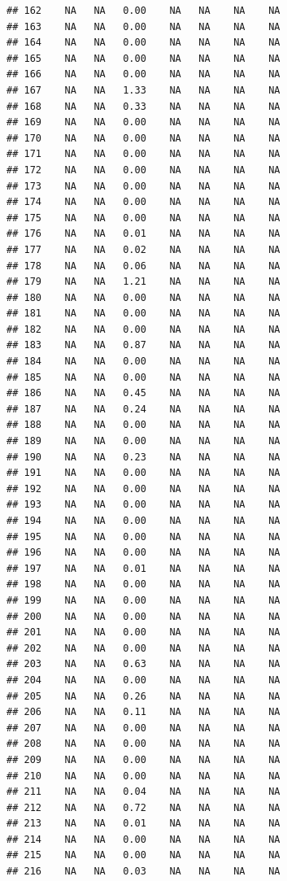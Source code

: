 \documentclass{article}\usepackage{graphicx, color}
\makeatletter
\newenvironment{kframe}{%
 \def\at@end@of@kframe{}%
 \ifinner\ifhmode%
  \def\at@end@of@kframe{\end{minipage}}%
  \begin{minipage}{\columnwidth}%
 \fi\fi%
 \def\FrameCommand##1{\hskip\@totalleftmargin \hskip-\fboxsep
 \colorbox{shadecolor}{##1}\hskip-\fboxsep
     \hskip-\linewidth \hskip-\@totalleftmargin \hskip\columnwidth}%
 \MakeFramed {\advance\hsize-\width
   \@totalleftmargin\z@ \linewidth\hsize
   \@setminipage}}%
 {\par\unskip\endMakeFramed%
 \at@end@of@kframe}
\newenvironment{knitrout}{}{} %
\makeatother
\begin{document}
\begin{knitrout}
\begin{kframe}
\begin{verbatim}
## 162    NA   NA   0.00    NA   NA    NA    NA
## 163    NA   NA   0.00    NA   NA    NA    NA
## 164    NA   NA   0.00    NA   NA    NA    NA
## 165    NA   NA   0.00    NA   NA    NA    NA
## 166    NA   NA   0.00    NA   NA    NA    NA
## 167    NA   NA   1.33    NA   NA    NA    NA
## 168    NA   NA   0.33    NA   NA    NA    NA
## 169    NA   NA   0.00    NA   NA    NA    NA
## 170    NA   NA   0.00    NA   NA    NA    NA
## 171    NA   NA   0.00    NA   NA    NA    NA
## 172    NA   NA   0.00    NA   NA    NA    NA
## 173    NA   NA   0.00    NA   NA    NA    NA
## 174    NA   NA   0.00    NA   NA    NA    NA
## 175    NA   NA   0.00    NA   NA    NA    NA
## 176    NA   NA   0.01    NA   NA    NA    NA
## 177    NA   NA   0.02    NA   NA    NA    NA
## 178    NA   NA   0.06    NA   NA    NA    NA
## 179    NA   NA   1.21    NA   NA    NA    NA
## 180    NA   NA   0.00    NA   NA    NA    NA
## 181    NA   NA   0.00    NA   NA    NA    NA
## 182    NA   NA   0.00    NA   NA    NA    NA
## 183    NA   NA   0.87    NA   NA    NA    NA
## 184    NA   NA   0.00    NA   NA    NA    NA
## 185    NA   NA   0.00    NA   NA    NA    NA
## 186    NA   NA   0.45    NA   NA    NA    NA
## 187    NA   NA   0.24    NA   NA    NA    NA
## 188    NA   NA   0.00    NA   NA    NA    NA
## 189    NA   NA   0.00    NA   NA    NA    NA
## 190    NA   NA   0.23    NA   NA    NA    NA
## 191    NA   NA   0.00    NA   NA    NA    NA
## 192    NA   NA   0.00    NA   NA    NA    NA
## 193    NA   NA   0.00    NA   NA    NA    NA
## 194    NA   NA   0.00    NA   NA    NA    NA
## 195    NA   NA   0.00    NA   NA    NA    NA
## 196    NA   NA   0.00    NA   NA    NA    NA
## 197    NA   NA   0.01    NA   NA    NA    NA
## 198    NA   NA   0.00    NA   NA    NA    NA
## 199    NA   NA   0.00    NA   NA    NA    NA
## 200    NA   NA   0.00    NA   NA    NA    NA
## 201    NA   NA   0.00    NA   NA    NA    NA
## 202    NA   NA   0.00    NA   NA    NA    NA
## 203    NA   NA   0.63    NA   NA    NA    NA
## 204    NA   NA   0.00    NA   NA    NA    NA
## 205    NA   NA   0.26    NA   NA    NA    NA
## 206    NA   NA   0.11    NA   NA    NA    NA
## 207    NA   NA   0.00    NA   NA    NA    NA
## 208    NA   NA   0.00    NA   NA    NA    NA
## 209    NA   NA   0.00    NA   NA    NA    NA
## 210    NA   NA   0.00    NA   NA    NA    NA
## 211    NA   NA   0.04    NA   NA    NA    NA
## 212    NA   NA   0.72    NA   NA    NA    NA
## 213    NA   NA   0.01    NA   NA    NA    NA
## 214    NA   NA   0.00    NA   NA    NA    NA
## 215    NA   NA   0.00    NA   NA    NA    NA
## 216    NA   NA   0.03    NA   NA    NA    NA

\end{verbatim}
\end{kframe}
\end{knitrout}
\end{document}
